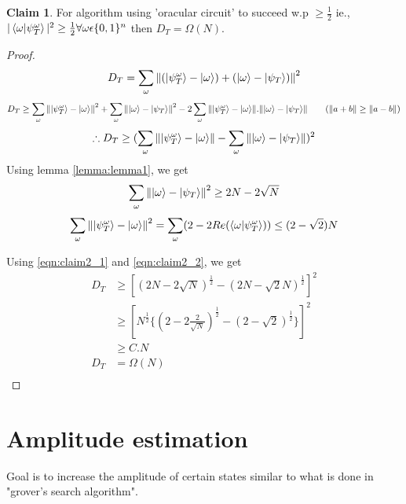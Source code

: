 \documentclass[11.5pt, paper=a4]{article}
\theoremstyle{definition}
\newtheorem{claim}{Claim}
\numberwithin{theorem}{section}
\begin{document}
\begin{claim}
For algorithm using 'oracular circuit' to succeed w.p $\ge \frac{1}{2}$ ie., $|\braket{\omega|\psi^\omega_T}|^2 \ge \frac{1}{2} \forall \omega \epsilon \{0,1\}^n$ then $D_T = \Omega(N)$.
\end{claim}
\begin{proof}
\begin{equation*}
    D_T = \sum_\omega\norm{(\ket{\psi^\omega_T}-\ket{\omega})+(\ket{\omega}-\ket{\psi_T})}^2
\end{equation*}
\begin{equation*}
    D_T \ge \sum_\omega\norm{\ket{\psi^\omega_T}-\ket{\omega}}^2 + \sum_\omega\norm{\ket{\omega}-\ket{\psi_T}}^2 -2\sum_\omega\norm{\ket{\psi^\omega_T}-\ket{\omega}}.\norm{\ket{\omega}-\ket{\psi_T}} \tag{$\norm{a+b} \ge \norm{a-b}$}
\end{equation*}
\begin{equation*}
    \therefore D_T \ge (\sum_\omega\norm{\ket{\psi^\omega_T}-\ket{\omega}} - \sum_\omega\norm{\ket{\omega}-\ket{\psi_T}})^2
\end{equation*}
Using lemma \ref{lemma:lemma1}, we get
\begin{equation}
\label{eqn:claim2_1}
    \sum_\omega\norm{\ket{\omega}-\ket{\psi_T}}^2 \ge 2N - 2\sqrt{N}
\end{equation}
\begin{equation}
\label{eqn:claim2_2}
    \sum_\omega\norm{\ket{\psi^\omega_T}-\ket{\omega}}^2 = \sum_\omega(2 - 2Re(\braket{\omega|\psi^\omega_T})) \le (2 - \sqrt{2})N
\end{equation}

Using \ref{eqn:claim2_1} and \ref{eqn:claim2_2}, we get
\begin{equation*}
\begin{split}
    D_T & \ge [(2N-2\sqrt{N})^\frac{1}{2}-(2N-\sqrt{2}N)^\frac{1}{2}]^2\\
    & \ge [N^\frac{1}{2}\{(2-2\frac{2}{\sqrt{N}})^\frac{1}{2}-(2-\sqrt{2})^\frac{1}{2}\}]^2\\
    & \ge C.N\\
    D_T & = \Omega(N)\\
\end{split}
\end{equation*}

\end{proof}

\section{Amplitude estimation}
\noindent Goal is to increase the amplitude of certain states similar to what is done in "grover's search algorithm".
\end{document}
